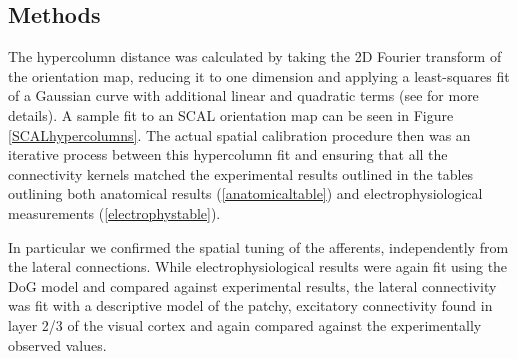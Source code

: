 \subsection{Methods}

The hypercolumn distance was calculated by taking the 2D Fourier
transform of the orientation map, reducing it to one dimension and
applying a least-squares fit of a Gaussian curve with additional
linear and quadratic terms (see \cite{Kaschube2010} for more
details). A sample fit to an SCAL orientation map can be seen in
Figure \ref{SCALhypercolumns}. The actual spatial calibration
procedure then was an iterative process between this hypercolumn fit
and ensuring that all the connectivity kernels matched the
experimental results outlined in the tables outlining both anatomical
results (\ref{anatomicaltable}) and electrophysiological measurements
(\ref{electrophystable}).

In particular we confirmed the spatial tuning of the afferents,
independently from the lateral connections. While electrophysiological
results were again fit using the DoG model and compared against
experimental results, the lateral connectivity was fit with a
descriptive model of the patchy, excitatory connectivity found in
layer 2/3 of the visual cortex and again compared against the
experimentally observed values.


